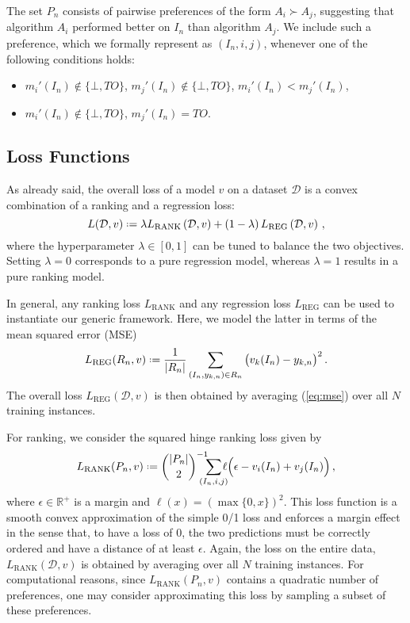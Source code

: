 \documentclass[runningheads]{llncs}
\newcommand*{\defeq}{\mathrel{\vcenter{\baselineskip0.5ex \lineskiplimit0pt
			\hbox{\footnotesize.}\hbox{\footnotesize.}}}%
	=}
\begin{document}
The set $P_n$ consists of pairwise preferences of the form $A_{i} \succ A_{j}$, suggesting that algorithm $A_i$ performed better on $I_n$ than algorithm $A_j$. We include such a preference, which we formally represent as $(I_n, i , j)$, whenever one of the following conditions holds:
\begin{itemize}
\item $m_i'(I_n) \not\in \{ \bot, TO\}$, $m_j'(I_n) \not\in \{ \bot, TO\}$, $m_i'(I_n) < m_j'(I_n)$,
\item $m_i'(I_n) \not\in \{ \bot, TO\}$, $m_j'(I_n) = TO$.
\end{itemize}



 
 
\subsection{Loss Functions}
\label{sec:hinge_rmse}
\label{sec:pl_rmse}

As already said, the overall loss of a model $v$ on a dataset $\mathcal{D}$ is a convex combination of a ranking and a regression loss:
\begin{equation}
\label{eq:convex_combination}
    L(\mathcal{D},v) \defeq \lambda L_\text{RANK}\left(\mathcal{D},v\right) + \left(1 - \lambda\right) L_\text{REG}\left(\mathcal{D},v\right) \, ,
\end{equation}
where the hyperparameter $\lambda \in [0,1]$ can be tuned to balance the two objectives. Setting $\lambda = 0$ corresponds to a pure regression model, whereas $\lambda=1$ results in a pure ranking model. 

In general, any ranking loss $L_\text{RANK}$ and any  regression loss $L_\text{REG}$ can be used to instantiate our generic framework. Here, we model the latter in terms of the mean squared error (MSE)
\begin{equation}
    \label{eq:mse}
    L_\text{REG}(R_n,v) \defeq \frac{1}{|R_n|} \sum_{\left(I_n, y_{k,n}\right) \in R_n}   
    \big(  v_k(I_n)  - y_{k,n} \big)^2 \, .
\end{equation}
The overall loss $L_\text{REG}(\mathcal{D},v)$ is then obtained by averaging (\ref{eq:mse}) over all $N$ training instances. 


For ranking, we consider the squared hinge ranking loss given by
\begin{equation}
\label{eq:hinge_loss}
L_\text{RANK}(P_n,v) \defeq   \binom{|P_n|}{2}^{-1} \!\!\!\!\!\! %
\sum_{(I_n, i , j)} \!\!\!\! \ell \Big( 
\epsilon -  v_i(I_n) + v_j(I_n)  \Big) \, ,
\end{equation}
where $\epsilon \in \mathbb{R^+}$ is a margin and $\ell(x) = (\max\{ 0, x \})^2$. This loss function is a smooth convex approximation of the 
simple 0/1 loss and enforces a margin effect in the sense that, to have a loss of 0, the two predictions must be correctly ordered and have a distance of at least $\epsilon$. Again, the loss on the entire data, $L_\text{RANK}(\mathcal{D}, v)$ is obtained by averaging over all $N$ training instances. For computational reasons, since $L_\text{RANK}(P_n,v)$ contains a quadratic number of preferences, one may consider approximating this loss by sampling a subset of these preferences.
\end{document}
